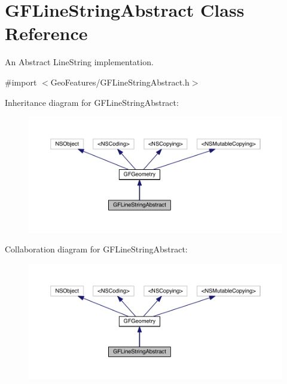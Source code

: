 \hypertarget{interface_g_f_line_string_abstract}{}\section{G\+F\+Line\+String\+Abstract Class Reference}
\label{interface_g_f_line_string_abstract}


An Abstract Line\+String implementation.  




{\ttfamily \#import $<$Geo\+Features/\+G\+F\+Line\+String\+Abstract.\+h$>$}



Inheritance diagram for G\+F\+Line\+String\+Abstract\+:\nopagebreak
\begin{figure}[H]
\begin{center}
\leavevmode
\includegraphics[width=350pt]{interface_g_f_line_string_abstract__inherit__graph}
\end{center}
\end{figure}


Collaboration diagram for G\+F\+Line\+String\+Abstract\+:\nopagebreak
\begin{figure}[H]
\begin{center}
\leavevmode
\includegraphics[width=350pt]{interface_g_f_line_string_abstract__coll__graph}
\end{center}
\end{figure}

